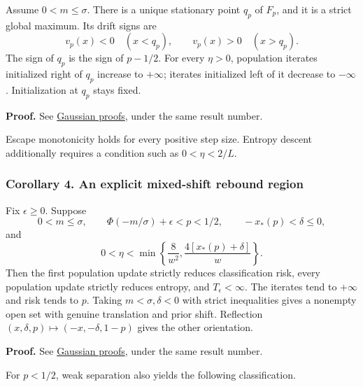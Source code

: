 Assume \(0<m\le\sigma\). There is a unique stationary point \(q_p\) of
\(F_p\), and it is a strict global maximum. Its drift signs are \[
v_p(x)<0\quad(x<q_p),\qquad v_p(x)>0\quad(x>q_p).
\] The sign of \(q_p\) is the sign of \(p-1/2\). For every \(\eta>0\),
population iterates initialized right of \(q_p\) increase to
\(+\infty\); iterates initialized left of it decrease to \(-\infty\).
Initialization at \(q_p\) stays fixed.

\textbf{Proof.} See \href{gaussian_proofs.md}{Gaussian proofs}, under
the same result number.

Escape monotonicity holds for every positive step size. Entropy descent
additionally requires a condition such as \(0<\eta<2/L\).

\subsubsection{Corollary 4. An explicit mixed-shift rebound
region}\label{draft-corollary-4.-an-explicit-mixed-shift-rebound-region}

Fix \(\epsilon\ge0\). Suppose \[
0<m\le\sigma,\qquad
\Phi(-m/\sigma)+\epsilon<p<1/2,\qquad -x_*(p)<\delta\le0,
\] and \[
0<\eta<\min\left\{\frac8{w^2},
\frac{4[x_*(p)+\delta]}{w}\right\}.
\] Then the first population update strictly reduces classification
risk, every population update strictly reduces entropy, and
\(T_\epsilon<\infty\). The iterates tend to \(+\infty\) and risk tends
to \(p\). Taking \(m<\sigma,\delta<0\) with strict inequalities gives a
nonempty open set with genuine translation and prior shift. Reflection
\((x,\delta,p)\mapsto(-x,-\delta,1-p)\) gives the other orientation.

\textbf{Proof.} See \href{gaussian_proofs.md}{Gaussian proofs}, under
the same result number.

For \(p<1/2\), weak separation also yields the following classification.

